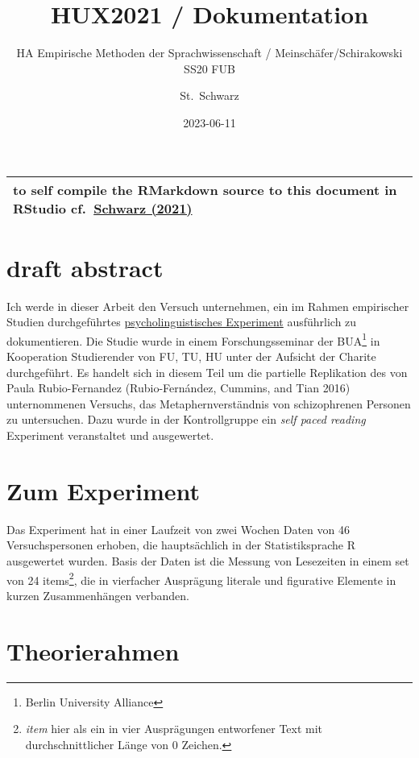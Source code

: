 \documentclass[
]{article}
\title{HUX2021 / Dokumentation}
\subtitle{HA Empirische Methoden der Sprachwissenschaft / Meinschäfer/Schirakowski SS20 FUB}
\author{St.~Schwarz}
\date{2023-06-11}
\begin{document}
\maketitle

{
\setcounter{tocdepth}{2}
\tableofcontents
}
\begin{longtable}[]{@{}l@{}}
\toprule()
\endhead
to self compile the RMarkdown source to this document in RStudio cf.~\href{https://github.com/esteeschwarz/DH_essais/blob/main/sections/hux2021/hux_HA/hux_ha_main.Rmd}{Schwarz (2021)} \\
\bottomrule()
\end{longtable}

\hypertarget{draft-abstract}{%
\section{draft abstract}\label{draft-abstract}}

Ich werde in dieser Arbeit den Versuch unternehmen, ein im Rahmen empirischer Studien durchgeführtes \href{https://github.com/esteeschwarz/essais/docs/hux2021}{psycholinguistisches Experiment} ausführlich zu dokumentieren. Die Studie wurde in einem Forschungsseminar der BUA\footnote{Berlin University Alliance} in Kooperation Studierender von FU, TU, HU unter der Aufsicht der Charite durchgeführt. Es handelt sich in diesem Teil um die partielle Replikation des von Paula Rubio-Fernandez (Rubio-Fernández, Cummins, and Tian 2016) unternommenen Versuchs, das Metaphernverständnis von schizophrenen Personen zu untersuchen. Dazu wurde in der Kontrollgruppe ein \emph{self paced reading} Experiment veranstaltet und ausgewertet.

\hypertarget{zum-experiment}{%
\section{Zum Experiment}\label{zum-experiment}}

Das Experiment hat in einer Laufzeit von zwei Wochen Daten von 46 Versuchspersonen erhoben, die hauptsächlich in der Statistiksprache R ausgewertet wurden. Basis der Daten ist die Messung von Lesezeiten in einem set von 24 items\footnote{\emph{item} hier als ein in vier Ausprägungen entworfener Text mit durchschnittlicher Länge von 0 Zeichen.}, die in vierfacher Ausprägung literale und figurative Elemente in kurzen Zusammenhängen verbanden.

\hypertarget{theorierahmen}{%
\section{Theorierahmen}\label{theorierahmen}}
\end{document}
